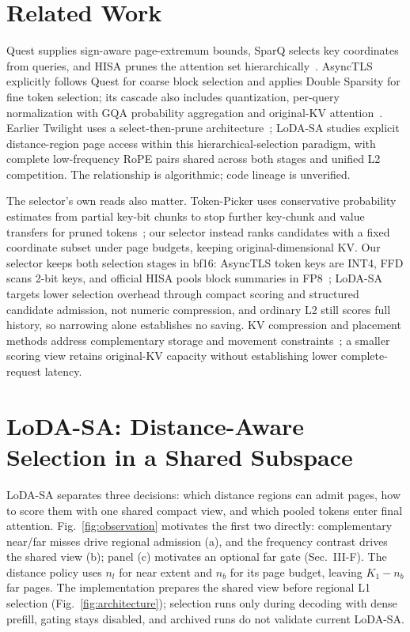 \documentclass[conference,9pt,letterpaper]{IEEEtran}
\begin{document}
\section{Related Work}
Quest supplies sign-aware page-extremum bounds, SparQ selects key coordinates from queries, and HISA prunes the attention set hierarchically~\cite{quest,sparq,hisa}. AsyncTLS explicitly follows Quest for coarse block selection and applies Double Sparsity for fine token selection; its cascade also includes quantization, per-query normalization with GQA probability aggregation and original-KV attention~\cite{asynctls}. Earlier Twilight uses a select-then-prune architecture~\cite{twilight}; LoDA-SA studies explicit distance-region page access within this hierarchical-selection paradigm, with complete low-frequency RoPE pairs shared across both stages and unified L2 competition. The relationship is algorithmic; code lineage is unverified.

The selector's own reads also matter. Token-Picker uses conservative probability estimates from partial key-bit chunks to stop further key-chunk and value transfers for pruned tokens~\cite{tokenpicker}; our selector instead ranks candidates with a fixed coordinate subset under page budgets, keeping original-dimensional KV. Our selector keeps both selection stages in bf16: AsyncTLS token keys are INT4, FFD scans 2-bit keys, and official HISA pools block summaries in FP8~\cite{asynctls,ffd,hisa}; LoDA-SA targets lower selection overhead through compact scoring and structured candidate admission, not numeric compression, and ordinary L2 still scores full history, so narrowing alone establishes no saving. KV compression and placement methods address complementary storage and movement constraints~\cite{shadowkv,million,clusterkv}; a smaller scoring view retains original-KV capacity without establishing lower complete-request latency.

\section{LoDA-SA: Distance-Aware Selection in a Shared Subspace}
LoDA-SA separates three decisions: which distance regions can admit pages, how to score them with one shared compact view, and which pooled tokens enter final attention. Fig.~\ref{fig:observation} motivates the first two directly: complementary near/far misses drive regional admission (a), and the frequency contrast drives the shared view (b); panel (c) motivates an optional far gate (Sec.~III-F). The distance policy uses $n_l$ for near extent and $n_b$ for its page budget, leaving $K_1-n_b$ far pages. The implementation prepares the shared view before regional L1 selection (Fig.~\ref{fig:architecture}); selection runs only during decoding with dense prefill, gating stays disabled, and archived runs do not validate current LoDA-SA.
\end{document}
